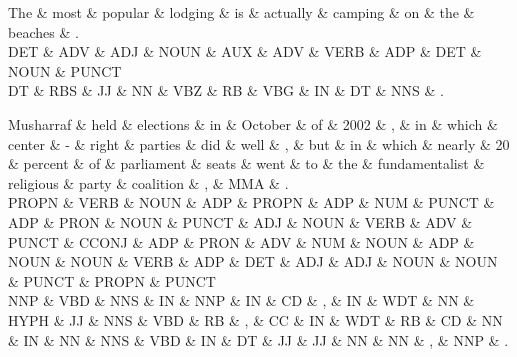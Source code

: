 \begin{dependency}
\begin{deptext}
The \& most \& popular \& lodging \& is \& actually \& camping \& on \& the \& beaches \& . \\
DET \& ADV \& ADJ \& NOUN \& AUX \& ADV \& VERB \& ADP \& DET \& NOUN \& PUNCT \\
DT \& RBS \& JJ \& NN \& VBZ \& RB \& VBG \& IN \& DT \& NNS \& . \\
\end{deptext}



\end{dependency}

\begin{dependency}
\begin{deptext}
Musharraf \& held \& elections \& in \& October \& of \& 2002 \& , \& in \& which \& center \& - \& right \& parties \& did \& well \& , \& but \& in \& which \& nearly \& 20 \& percent \& of \& parliament \& seats \& went \& to \& the \& fundamentalist \& religious \& party \& coalition \& , \& MMA \& . \\
PROPN \& VERB \& NOUN \& ADP \& PROPN \& ADP \& NUM \& PUNCT \& ADP \& PRON \& NOUN \& PUNCT \& ADJ \& NOUN \& VERB \& ADV \& PUNCT \& CCONJ \& ADP \& PRON \& ADV \& NUM \& NOUN \& ADP \& NOUN \& NOUN \& VERB \& ADP \& DET \& ADJ \& ADJ \& NOUN \& NOUN \& PUNCT \& PROPN \& PUNCT \\
NNP \& VBD \& NNS \& IN \& NNP \& IN \& CD \& , \& IN \& WDT \& NN \& HYPH \& JJ \& NNS \& VBD \& RB \& , \& CC \& IN \& WDT \& RB \& CD \& NN \& IN \& NN \& NNS \& VBD \& IN \& DT \& JJ \& JJ \& NN \& NN \& , \& NNP \& . \\
\end{deptext}



\end{dependency}

